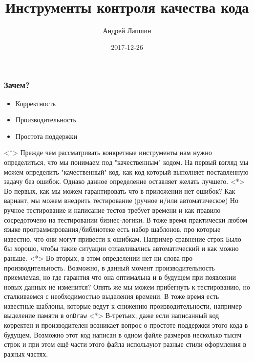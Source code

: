 \documentclass{beamer}
\author{Андрей Лапшин}
\date{2017-12-26}
\title{Инструменты контроля качества кода}
\begin{document}
\begin{frame}
    \titlepage
\end{frame}

\begin{frame}
    \frametitle{Зачем?}
    \begin{itemize}
        \item{Корректность}
        \item{Производительность}
        \item{Простота поддержки}
    \end{itemize}
    \note<*>{
        Прежде чем рассматривать конкретные инструменты нам нужно определиться,
        что мы понимаем под "качественным" кодом. На первый взгляд мы можем определить
        "качественный" код, как код который выполняет поставленную задачу без ошибок.
        Однако данное определение оставляет желать лучшего.
    }
    \note<*>{
        Во-первых, как мы можем гарантировать что в приложении нет ошибок?
        Как вариант, мы можем внедрить тестирование (ручное и/или автоматическое)
        Но ручное тестирование и написание тестов требует времени и как правило
        сосредоточено на тестировании бизнес-логики. В тоже время практически
        любом языке программирования/библиотеке есть набор шаблонов, про которые
        известно, что они могут привести к ошибкам. Например сравнение строк
        Было бы хорошо, чтобы такие ситуации отлавливались автоматический и как можно раньше.
    }
    \note<*>{
        Во-вторых, в этом определении нет ни слова про производительность.
        Возможно, в данный момент производительность приемлемая, но где гарантия
        что она оптимальна и в будущем при появлении новых данных не изменится?
        Опять же мы можем прибегнуть к тестированию, но сталкиваемся с необходимостью
        выделения времени. В тоже время есть известные шаблоны, которые ведут
        к снижению производительности, например выделение памяти в \texttt{onDraw}
    }
    \note<*>{
        В-третьих, даже если написанный код корректен и производителен возникает
        вопрос о простоте поддержки этого кода в будущем. Возможно этот код
        написан в одном файле размеров несколько тысяч строк и при этом ещё
        части этого файла используют разные стили оформления в разных частях.
    }
\end{frame}
\end{document}
